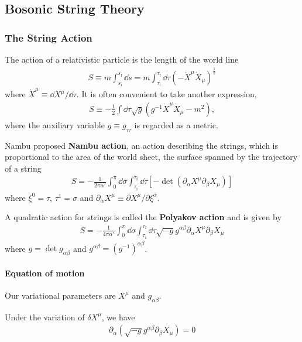 \documentclass[10pt]{article}
\begin{document}
\subsection{Bosonic String Theory}

\subsubsection{The String Action}

The action of a relativistic particle is the length of the world line
\begin{align}
    S\equiv m\int_{s_{\text{i}}}^{s_{\text{f}}}\dd{s}=m\int_{\tau_{\text{i}}}^{\tau_{\text{f}}}\dd{\tau}\left(-\dot{X}^\mu \dot{X}_\mu\right)^{\frac{1}{2}}
\end{align}
where $\dot{X}^\mu\equiv\dd{X}^\mu/\dd{\tau}$.
It is often convenient to take another expression,
\begin{align}
    S\equiv-\frac{1}{2}\int\dd{\tau}\sqrt{g}\left(g^{-1}\dot{X}^\mu\dot{X}_\mu-m^2\right),
\end{align}
where the auxiliary variable $g\equiv g_{\tau\tau}$ is regarded as a metric.

Nambu proposed \textbf{Nambu action}, an action describing the strings, which is proportional to the area of the world sheet, the surface spanned by the trajectory of a string
\begin{align}
    S=-\frac{1}{2\pi\alpha'}\int_{0}^{\pi}\dd{\sigma}\int_{\tau_{\text{i}}}^{\tau_{\text{f}}}\dd{\tau}\left[-\det\left(\partial_\alpha X^\mu \partial_\beta X_\mu\right)\right]
\end{align}
where $\xi^0=\tau$, $\tau^1=\sigma$ and $\partial_\alpha X^\mu\equiv\partial X^\mu/\partial\xi^\alpha$.

A quadratic action for strings is called the \textbf{Polyakov action} and is given by
\begin{align}\label{Polyakov}
    S=-\frac{1}{4\pi\alpha'}\int_{0}^\pi\dd{\sigma}\int^{\tau_{\text{f}}}_{\tau_{\text{i}}}\dd{\tau}\sqrt{-g}g^{\alpha\beta}\partial_\alpha X^\mu \partial_\beta X_\mu
\end{align}
where $g=\det g_{\alpha\beta}$ and $g^{\alpha\beta}=\left(g^{-1}\right)^{\alpha\beta}$.
\paragraph{Equation of motion} 
Our variational parameters are $X^\mu$ and $g_{\alpha\beta}$.

Under the variation of $\delta X^\mu$, we have 
\begin{align}
    \partial_\alpha\left(\sqrt{-g}g^{\alpha\beta}\partial_\beta X_\mu\right)=0
\end{align}
\end{document}
